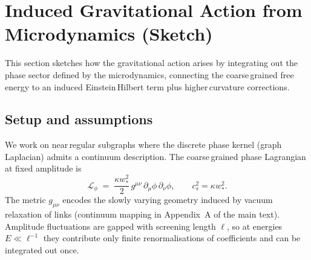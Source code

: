 \documentclass[11pt]{article}
\begin{document}
\section{Induced Gravitational Action from Microdynamics (Sketch)}\label{si:induced-gravity}
This section sketches how the gravitational action arises by integrating out the phase sector defined by the microdynamics, connecting the coarse\,grained free energy to an induced Einstein\,Hilbert term plus higher\,curvature corrections.

\subsection*{Setup and assumptions}
We work on near\,regular subgraphs where the discrete phase kernel (graph Laplacian) admits a continuum description. The coarse\,grained phase Lagrangian at fixed amplitude is
\begin{equation}
  \mathcal L_\phi \;=\; \frac{\kappa w_*^2}{2}\, g^{\mu\nu}\, \partial_\mu\phi\,\partial_\nu\phi,\qquad c_s^2=\kappa w_*^2.
\end{equation}
The metric $g_{\mu\nu}$ encodes the slowly varying geometry induced by vacuum relaxation of links (continuum mapping in Appendix~A of the main text). Amplitude fluctuations are gapped with screening length $\ell$, so at energies $E\ll \ell^{-1}$ they contribute only finite renormalisations of coefficients and can be integrated out once.
\end{document}
